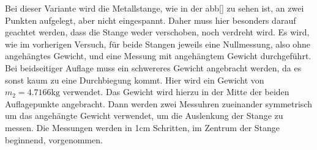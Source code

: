 Bei dieser Variante wird die Metallstange, wie in der abb[] zu sehen ist, an zwei Punkten aufgelegt, aber nicht eingespannt. Daher muss 
hier besonders darauf geachtet werden, dass die Stange weder verschoben, noch verdreht wird. Es wird, wie im vorherigen Versuch, für 
beide Stangen jeweils eine Nullmessung, also ohne angehängtes Gewicht, und eine Messung mit angehängtem Gewicht durchgeführt. Bei beidseitiger Auflage muss ein schwereres Gewicht angebracht werden, da es sonst kaum zu eine Durchbiegung kommt. Hier wird ein Gewicht von $m_2 = 4.7166 \si{\kilo\gram}$ verwendet.
Das Gewicht wird hierzu in der Mitte der beiden Auflagepunkte angebracht. Dann werden zwei Messuhren zueinander symmetrisch um das 
angehängte Gewicht verwendet, um die Auslenkung der Stange zu messen. Die Messungen werden in 1$\si{\centi\meter}$ Schritten, im Zentrum 
der Stange beginnend, vorgenommen. 